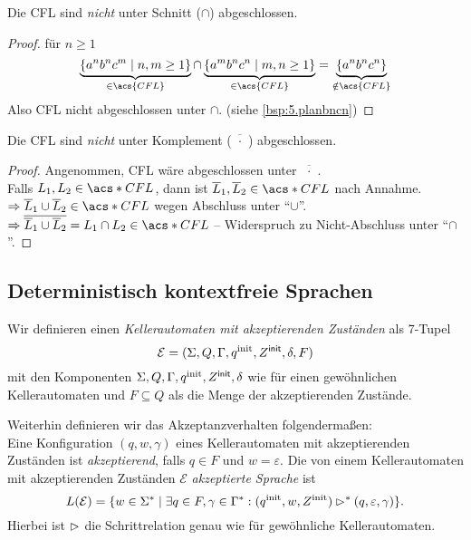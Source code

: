 \begin{Satz}
 	Die \ac{CFL} sind \emph{nicht} unter Schnitt ($\cap$) abgeschlossen.
\end{Satz}
\begin{proof}
 für $n\geq 1$
		\[ \underbrace{\{a^nb^nc^m \mid n,m\geq 1 \}}_{\in \acs{CFL}} \cap \underbrace{\{a^mb^nc^n \mid m,n\geq 1 \}}_{\in \acs{CFL}} = \underbrace{\{a^nb^nc^n\}}_{\notin \acs{CFL}} \]
		Also \ac{CFL} nicht abgeschlossen unter $\cap$.
		(siehe \autoref{bsp:5.planbncn})
\end{proof}


\begin{Satz}
 	Die \ac{CFL} sind \emph{nicht} unter Komplement ($\overline{\!\phantom{i}\cdot\!\phantom{i}}$) abgeschlossen.
\end{Satz}
\begin{proof}
Angenommen, CFL wäre abgeschlossen unter $\overline{\!\phantom{i}\cdot\!\phantom{i}}$.\\
		Falls $L_1,L_2\in \acs*{CFL}$, dann ist $\overline{L}_1,\overline{L}_2\in\acs*{CFL}$ nach Annahme.\\
		$\Rightarrow \overline{L}_1\cup \overline{L}_2\in\acs*{CFL}$ wegen Abschluss unter "`$\cup$"'.\\
		$\Rightarrow \overline{\overline{L}_1\cup \overline{L}_2} = L_1\cap L_2\in\acs*{CFL}$ -- Widerspruch zu Nicht-Abschluss unter "`$\cap$"'. \qedhere
\end{proof}



\subsection{Deterministisch kontextfreie Sprachen}

\begin{Def}
Wir definieren einen \emph{Kellerautomaten mit akzeptierenden Zuständen} als 7-Tupel
\[
	\mathcal{E} = (\Sigma,Q,\Gamma,q^\text{init},Z^\mathsf{init},\delta,F)
\]
mit den Komponenten $\Sigma,Q,\Gamma,q^\text{init},Z^\mathsf{init},\delta$ wie für einen gewöhnlichen Kellerautomaten und $F \subseteq Q$ als die Menge der akzeptierenden Zustände.

\smallskip

Weiterhin definieren wir das Akzeptanzverhalten folgendermaßen: \\
Eine Konfiguration $(q, w, \gamma)$ eines Kellerautomaten mit akzeptierenden Zuständen ist \emph{akzeptierend}, falls $q \in F$ und $w = \varepsilon$.
Die von einem Kellerautomaten mit akzeptierenden Zuständen $\mathcal{E}$ \emph{akzeptierte Sprache} ist
\[
	L(\mathcal{E}) = \{w \in \Sigma^* \mid \exists q \in F, \gamma \in \Gamma^*: (q^\text{init}, w, Z^\text{init}) \rhd^* (q, \varepsilon, \gamma)\}.
\]
Hierbei ist $\rhd$ die Schrittrelation genau wie für gewöhnliche Kellerautomaten.
\end{Def}

